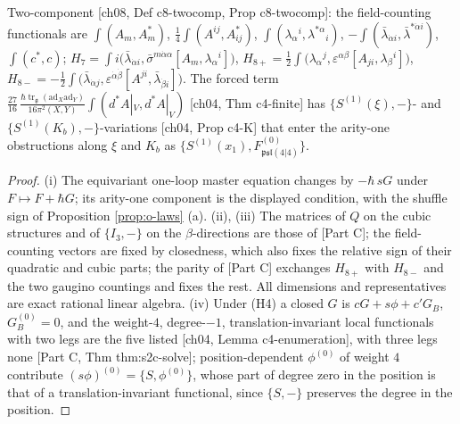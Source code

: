 \begin{proposition}
\begin{itemize}
\end{itemize}
Two-component [ch08, Def c8-twocomp, Prop c8-twocomp]: the field-counting functionals are $\int(A_m,A^*_m)$, $\tfrac14\int(A^{ij},A^*_{ij})$, $\int(\lambda_\alpha{}^i,\lambda^{*\alpha}{}_i)$, $-\int(\bar\lambda_{\dot\alpha i},\bar\lambda^{*\dot\alpha i})$, $\int(c^*,c)$; $H_7=\int i\big(\bar\lambda_{\dot\alpha i},\bar\sigma^{m\dot\alpha\alpha}[A_m,\lambda_\alpha{}^i]\big)$, $H_{8+}=\tfrac12\int\big(\lambda_\alpha{}^j,\varepsilon^{\alpha\beta}[A_{ji},\lambda_\beta{}^i]\big)$, $H_{8-}=-\tfrac12\int\big(\bar\lambda_{\dot\alpha j},\varepsilon^{\dot\alpha\dot\beta}[A^{ji},\bar\lambda_{\dot\beta i}]\big)$. The forced term $\tfrac{27}{16}\,\frac{\hbar\operatorname{tr}_{\mathfrak g}(\mathrm{ad}_X\mathrm{ad}_Y)}{16\pi^2(X,Y)}\int(d^*A|_V,d^*A|_V)$ [ch04, Thm c4-finite] has $\{S^{(1)}(\xi),-\}$- and $\{S^{(1)}(K_b),-\}$-variations [ch04, Prop c4-K] that enter the arity-one obstructions along $\xi$ and $K_b$ as $\{S^{(1)}(x_1),F^{(0)}_{\mathfrak{psl}(4|4)}\}$.
\end{proposition}

\begin{proof}
(i) The equivariant one-loop master equation changes by $-\hbar\,sG$ under $F\mapsto F+\hbar G$; its arity-one component is the displayed condition, with the shuffle sign of Proposition \ref{prop:o-laws} (a). (ii), (iii) The matrices of $Q$ on the cubic structures and of $\{I_3,-\}$ on the $\beta$-directions are those of [Part C]; the field-counting vectors are fixed by closedness, which also fixes the relative sign of their quadratic and cubic parts; the parity of [Part C] exchanges $H_{8+}$ with $H_{8-}$ and the two gaugino countings and fixes the rest. All dimensions and representatives are exact rational linear algebra. (iv) Under (H4) a closed $G$ is $cG+s\phi+c'G_B$, $G_B^{(0)}=0$, and the weight-$4$, degree-$-1$, translation-invariant local functionals with two legs are the five listed [ch04, Lemma c4-enumeration], with three legs none [Part C, Thm thm:s2c-solve]; position-dependent $\phi^{(0)}$ of weight $4$ contribute $(s\phi)^{(0)}=\{S,\phi^{(0)}\}$, whose part of degree zero in the position is that of a translation-invariant functional, since $\{S,-\}$ preserves the degree in the position.
\end{proof}

